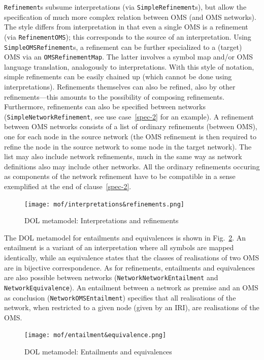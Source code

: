 \documentclass[10pt, a4paper]{isov2}
\newcommand*{\syntax}[1]{\texttt{#1}}
\begin{document}
\syntax{Refinement}s subsume interpretations (via
\syntax{SimpleRefinement}s), but allow the specification of much more
complex relation between OMS (and OMS networks).  The style differs
from interpretation in that even a single OMS is a refinement (via
\syntax{RefinementOMS}); this corresponds to the source of an
interpretation. Using \syntax{SimpleOMSRefinement}s, a refinement can
be further specialized to a (target) OMS via an
\syntax{OMSRefinementMap}. The latter involves a symbol map and/or OMS
language translation, analogously to interpretations.  With this style
of notation, simple refinements can be easily chained up (which cannot
be done using interpretations).  Refinements themselves can
also be refined, also by other refinements---this amounts
to the possibility of composing refinements. Furthermore,
refinements can also be specified between networks
(\syntax{SimpleNetworkRefinement}, see use case~\ref{spec-2} for an example).  
A refinement between OMS networks
consists of a list of ordinary refinements (between OMS), one for
each node in the source network (the OMS refinement is then required
to refine the node in the source network to some node in the target
network). The list may also include network refinements, much in the
same way as network definitions also may include other networks.
All the ordinary refinements occuring as components of the
network refinement have to be compatible in a sense exemplified
at the end of clause~\ref{spec-2}.

\medskip
\begin{figure}
  \centering
    \texttt{[image: mof/interpretations\&refinements.png]}
  \caption{DOL metamodel: Interpretations and refinements}
  \label{fig:interpretations&refinements}
\end{figure}

The DOL metamodel for entailments and equivalences is shown in 
Fig.~\ref{fig:entailment&equivalence}.
An entailment is a variant of an interpretation where all symbols are
mapped identically, while an equivalence states that the classes of realisations
of two OMS are in bijective correspondence. As for refinements,
entailments and equivalences are also possible between networks
(\syntax{NetworkNetworkEntailment} and \syntax{NetworkEquivalence}).
An entailment between a network as premise and an OMS as conclusion
(\syntax{NetworkOMSEntailment}) specifies that all realisations of the
network, when restricted to a given node (given by an IRI), are
realisations of the OMS.

\begin{figure}
  \centering
    \texttt{[image: mof/entailment\&equivalence.png]}
  \caption{DOL metamodel: Entailments and equivalences}
  \label{fig:entailment&equivalence}
\end{figure}
\end{document}
